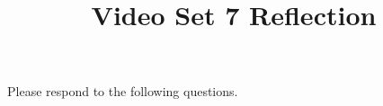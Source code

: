 \documentclass[handout]{ximera}
\title{Video Set 7 Reflection}
\begin{document}
\begin{abstract}
\end{abstract}

\maketitle

Please respond to the following questions.

\end{document}
